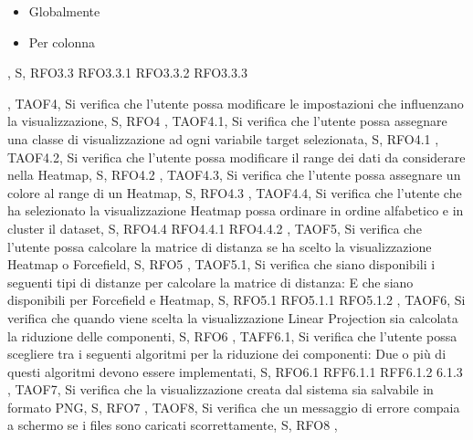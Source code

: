 {{{\begin{itemize}
                \item Globalmente
                \item Per colonna
            \end{itemize}},
            S,
            RFO3.3 RFO3.3.1 RFO3.3.2 RFO3.3.3
        },
        {   
            TAOF4,
            Si verifica che l'utente possa modificare le impostazioni che influenzano la visualizzazione,
            S,
            RFO4
        },
        {   
            TAOF4.1,
            Si verifica che l'utente possa assegnare una classe di visualizzazione ad ogni variabile target selezionata,
            S,
            RFO4.1
        },
        {   
            TAOF4.2,
            Si verifica che l'utente possa modificare il range dei dati da considerare nella Heatmap,
            S,
            RFO4.2
        },
        {   
            TAOF4.3,
            Si verifica che l'utente possa assegnare un colore al range di un Heatmap,
            S,
            RFO4.3
        },
        {   
            TAOF4.4,
            Si verifica che l'utente che ha selezionato la visualizzazione Heatmap possa ordinare in ordine alfabetico e in cluster il dataset,
            S,
            RFO4.4 RFO4.4.1 RFO4.4.2
        },
        {   
            TAOF5,
            Si verifica che l'utente possa calcolare la matrice di distanza se ha scelto la visualizzazione Heatmap o Forcefield,
            S,
            RFO5
        },    
        {   
            TAOF5.1,
            Si verifica che siano disponibili i seguenti tipi di distanze per calcolare la matrice di distanza:
            E che siano disponibili per Forcefield e Heatmap,
            S,
            RFO5.1 RFO5.1.1 RFO5.1.2
        },
        {   
            TAOF6,
            Si verifica che quando viene scelta la visualizzazione Linear Projection sia calcolata la riduzione delle componenti,
            S,
            RFO6
        },
        {   
            TAFF6.1,
            Si verifica che l'utente possa scegliere tra i seguenti algoritmi per la riduzione dei componenti:
            Due o più di questi algoritmi devono essere implementati,
            S,
            RFO6.1 RFF6.1.1 RFF6.1.2 6.1.3
        },
        {   
            TAOF7,
            Si verifica che la visualizzazione creata dal sistema sia salvabile in formato PNG,
            S,
            RFO7
        },
        {   
            TAOF8,
            Si verifica che un messaggio di errore compaia a schermo se i files sono caricati scorrettamente,
            S,
            RFO8
        },
        }
        
